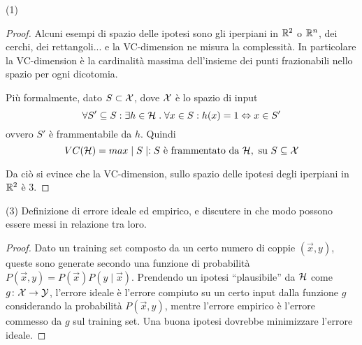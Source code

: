 \documentclass[12pt,a4paper,oneside]{book}
\begin{document}
\begin{exercise}{(1)}
\begin{proof}
        Alcuni esempi di spazio delle ipotesi sono gli iperpiani in
        $\mathbb{R}^2$ o $\mathbb{R}^n$, dei cerchi, dei rettangoli... e la
        VC-dimension ne misura la complessità. In particolare la
        VC-dimension è la cardinalità massima dell'insieme dei punti
        frazionabili nello spazio per ogni dicotomia.
        
        Più formalmente, dato $S \subset \mathcal{X}$, dove $\mathcal{X}$ è lo
        spazio di input
        \[
            \forall S' \subseteq S \mathrel{:} \exists h \in \mathcal{H} \mathrel{.} \forall x \in S \mathrel{:} h(x) = 1 \Leftrightarrow x \in S'
        \] 
        ovvero $S'$ è frammentabile da $h$.
        Quindi
        \[
            VC(\mathcal{H}) = max \mid S \mid \mathrel{:} S\text{ è frammentato da }\mathcal{H},\text{ su }S \subseteq \mathcal{X}
        \]
        
        Da ciò si evince che la VC-dimension, sullo spazio delle
        ipotesi degli iperpiani in $\mathbb{R}^2$ è 3.
    \end{proof}
\end{exercise}

\begin{exercise}(3)
    Definizione di errore ideale ed empirico, e discutere in che modo
    possono essere messi in relazione tra loro.
    
    \begin{proof}
        Dato un training set composto da un certo numero di coppie
        $(\vec{x},y)$, queste sono generate secondo una funzione di
        probabilità $P(\vec{x},y) =
        P(\vec{x})P(y\mid\vec{x})$. Prendendo un ipotesi
        ``plausibile'' da $\mathcal{H}$ come $\mathord{g}\colon\mathcal{X}\to\mathcal{Y}$,
        l'errore ideale è l'errore compiuto su un certo input dalla
        funzione $g$ considerando la probabilità $P(\vec{x},y)$,
        mentre l'errore empirico è l'errore commesso da $g$ sul
        training set. Una buona ipotesi dovrebbe minimizzare l'errore
        ideale.
    \end{proof}
\end{exercise}
\end{document}
